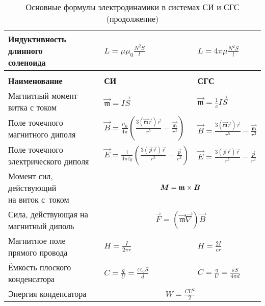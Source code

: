 \begin{labsupplement}
\begin{longtable}{p{40mm}p{30mm}p{30mm}}
\parbox{40mm}{Индуктивность длинного\\[-2.5pt] соленоида}
        & $L=\mu\mu_0\frac{N^2S}{l}$    &   $L=4\pi\mu \frac{N^2S}{l}$	\bigstrut\\ \hline
\newpage
\caption[]{Основные формулы электродинамики в системах СИ и СГС (продолжение)}  \\
\toprule[1pt]
\textbf{Наименование} & \textbf{СИ} & \textbf{СГС} \\
\midrule[1pt]
\parbox{40mm}{Магнитный момент\\[-2.5pt] витка с током}
        & $\vec{\mathfrak{m}  }=I\vec{S}$		&   $\vec{\mathfrak{m}  }=\frac{1}{c}I\vec{S}$	\bigstrut\\ \hline
\parbox{40mm}{Поле точечного\\[-2.5pt] магнитного диполя}
        & $\vec{B}=\frac{\mu_0}{4\pi}\!\left(\!\frac{3(\vec{\mathfrak{m}}\vec{r})\vec{r}}{r^5}-\frac{\vec{\mathfrak{m}}}{r^3}\!\right)$
        & $\vec{B}=\frac{3(\vec{\mathfrak{m}}\vec{r})\vec{r}}{r^5}-\frac{\vec{\mathfrak{m}}}{r^3}$ \bigstrut\\ \hline
\parbox{40mm}{Поле точечного\\[-2.5pt] электрического диполя}
        & $\vec{E}=\frac{1}{4\pi\varepsilon_0}\!\left(\!\frac{3(\vec{p}\vec{r})\vec{r}}{r^5}-\frac{\vec{p}}{r^3}\!\right)$
        & $\vec{E}=\frac{3(\vec{p}\vec{r})\vec{r}}{r^5}-\frac{\vec{p}}{r^3}$ \bigstrut\\ \hline
\parbox{40mm}{Момент сил, действующий\\[-2.5pt] на виток с~током}
        & \bigstrut\\ \hline
\parbox{40mm}{Сила, действующая на\\[-2.5pt] магнитный диполь}
        &  \bigstrut\\ \hline
\parbox{40mm}{Магнитное поле\\[-2.pt] прямого провода}
    & $H = \frac{I}{2\pi r}$ & $H=\frac{2I}{cr}$ \bigstrut \\ \hline
\parbox{40mm}{Ёмкость плоского\\[-2.5pt] конденсатора}
        & $C=\frac{q}{U}=\frac{\varepsilon\varepsilon_0S}{d}$
        & $C=\frac{q}{U}=\frac{\varepsilon S}{4\pi d}$ \bigstrut \\ \hline
Энергия конденсатора
        &  \bigstrut\\
\bottomrule[1pt]
\end{longtable}
\endgroup


\end{labsupplement}
